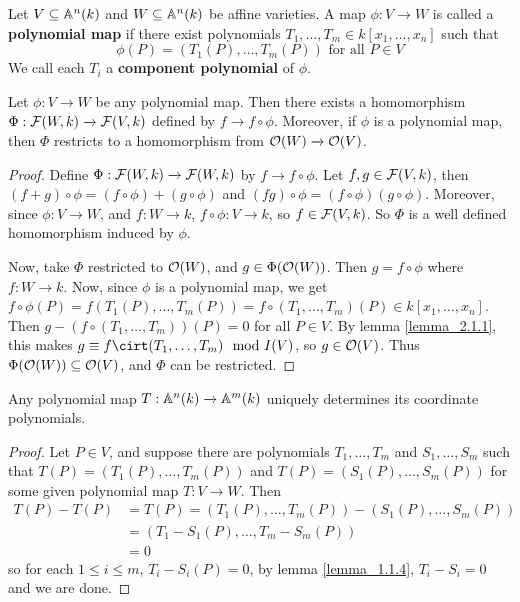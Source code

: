 \begin{definition}
  Let $V \subseteq \mathbb{A}^n(k)$ and $W \subseteq \mathbb{A}^n(k)$ be affine varieties. A map
  $\phi:V \xrightarrow{} W$ is called a \textbf{polynomial map} if there exist
  polynomials $T_1, \dots, T_m \in k[x_1, \dots, x_n]$ such that
  \begin{equation*}
    \phi(P)=(T_1(P), \dots, T_m(P)) \text{ for all } P \in V
  \end{equation*}
  We call each $T_i$ a \textbf{component polynomial} of $\phi$.
\end{definition}

\begin{lemma}\label{lemma_2.1.2}
  Let $\phi:V \xrightarrow{} W$ be any polynomial map. Then there exists a
  homomorphism $\Phi:\mathcal{F}(W,k) \xrightarrow{} \mathcal{F}(V,k)$ defined by $f
  \xrightarrow{} f \circ \phi$. Moreover, if $\phi$ is a polynomial map, then
  $\Phi$ restricts to a homomorphism from  $\mathcal{O}(W) \xrightarrow{} \mathcal{O}(V)$.
\end{lemma}
\begin{proof}
  Define $\Phi:\mathcal{F}(W,k) \xrightarrow{} \mathcal{F}(W,k)$ by $f \xrightarrow{} f \circ
  \phi$. Let $f,g \in \mathcal{F}(V,k)$, then $(f+g) \circ \phi=(f \circ \phi)+(g \circ
  \phi)$ and $(fg) \circ \phi=(f \circ \phi)(g \circ \phi)$. Moreover, since
  $\phi:V \xrightarrow{} W$, and $f:W \xrightarrow{} k$, $f \circ \phi: V
  \xrightarrow{} k$, so $f \in \mathcal{F}(V,k)$. So $\Phi$ is a well defined
  homomorphism induced by $\phi$.

  Now, take $\Phi$ restricted to $\mathcal{O}(W)$, and $g \in \Phi(\mathcal{O}(W))$. Then $g=f
  \circ \phi$ where $f:W \xrightarrow{} k$. Now, since $\phi$ is a polynomial
  map, we get $f \circ \phi(P)=f(T_1(P), \dots, T_m(P))=f \circ (T_1, \dots,
  T_m)(P) \in k[x_1, \dots, x_n]$. Then $g-(f \circ (T_1, \dots, T_m))(P)=0$ for
  all $P \in V$. By lemma \ref{lemma_2.1.1}, this makes $g \equiv f \cirt (T_1,
  \dots, T_m) \mod{I(V)}$, so $g \in \mathcal{O}(V)$. Thus $\Phi(\mathcal{O}(W)) \subseteq
  \mathcal{O}(V)$, and $\Phi$ can be restricted.
\end{proof}

\begin{lemma}\label{lemma_2.1.3}
  Any polynomial map $T:\mathbb{A}^n(k) \xrightarrow{} \mathbb{A}^m(k)$ uniquely determines its
  coordinate polynomials.
\end{lemma}
\begin{proof}
  Let $P \in V$, and suppose there are polynomials $T_1, \dots, T_m$ and $S_1,
  \dots, S_m$ such that $T(P)=(T_1(P), \dots, T_m(P))$ and
  $T(P)=(S_1(P), \dots, S_m(P))$ for some given polynomial map
  $T:V \xrightarrow{} W$. Then
  \begin{align*}
    T(P)-T(P) &= T(P)=(T_1(P), \dots, T_m(P))-(S_1(P), \dots, S_m(P)) \\
        &=  (T_1-S_1(P), \dots, T_m-S_m(P))  \\
        &=  0
  \end{align*}
  so for each $1 \leq i \leq m$, $T_i-S_i(P)=0$, by lemma \ref{lemma_1.1.4},
  $T_i-S_i=0$ and we are done.
\end{proof}

